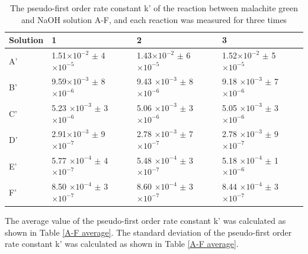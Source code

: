 \documentclass[twocolumn]{article} %
\begin{document}
\begin{table}[h]
    \caption{The pseudo-first order rate constant k' of the reaction between malachite green and NaOH solution A-F, and each reaction was measured for three times}
    \label{A-F}
    \begin{tabular}{L{0.3in}C{0.9in}C{0.9in}C{0.9in}}\toprule
        Solution & 1  & 2 & 3  \\\midrule
        A' & 1.51$\times 10^{-2}$ $\pm$ 4 $\times 10^{-5}$ & 1.43$\times 10^{-2}$ $\pm$ 6 $\times 10^{-5}$  & 1.52$\times 10^{-2}$ $\pm$ 5 $\times 10^{-5}$   \\
        B' & 9.59$\times 10^{-3}$ $\pm$ 8 $\times 10^{-6}$ & 9.43 $\times 10^{-3}$ $\pm$ 8 $\times 10^{-6}$  & 9.18 $\times 10^{-3}$ $\pm$ 7 $\times 10^{-6}$   \\
        C' & 5.23 $\times 10^{-3}$ $\pm$ 3 $\times 10^{-6}$ & 5.06 $\times 10^{-3}$ $\pm$ 3 $\times 10^{-6}$  & 5.05 $\times 10^{-3}$ $\pm$ 3 $\times 10^{-6}$  \\
        D' & 2.91$\times 10^{-3}$ $\pm$ 9 $\times 10^{-7}$ & 2.78 $\times 10^{-3}$ $\pm$ 7 $\times 10^{-7}$  & 2.78 $\times 10^{-3}$ $\pm$ 9 $\times 10^{-7}$   \\
        E' & 5.77 $\times 10^{-4}$ $\pm$ 4 $\times 10^{-7}$ & 5.48 $\times 10^{-4}$ $\pm$ 3 $\times 10^{-7}$  & 5.18 $\times 10^{-4}$ $\pm$ 1 $\times 10^{-6}$   \\
        F' & 8.50 $\times 10^{-4}$ $\pm$ 3 $\times 10^{-7}$ & 8.60 $\times 10^{-4}$ $\pm$ 3 $\times 10^{-7}$  & 8.44 $\times 10^{-4}$ $\pm$ 3 $\times 10^{-7}$ \\\bottomrule
   \end{tabular}
\end{table}


The average value of the pseudo-first order rate constant k' was calculated as shown in Table \ref{A-F average}. The standard deviation of the pseudo-first order rate constant k' was calculated as shown in Table \ref{A-F average}.\\[1\baselineskip]
\end{document}
